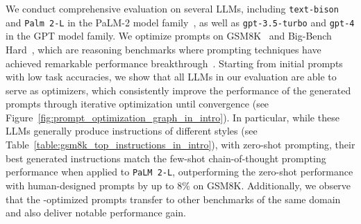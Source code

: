 We conduct comprehensive evaluation on several LLMs, including \texttt{text-bison} and \texttt{Palm 2-L} in the PaLM-2 model family~\citep{anil2023palm}, as well as \texttt{gpt-3.5-turbo} and \texttt{gpt-4} in the GPT model family. 
We optimize prompts on GSM8K~\citep{cobbe2021training} and Big-Bench Hard~\citep{suzgun2022challenging}, which are reasoning benchmarks where prompting techniques have achieved remarkable performance breakthrough~\citep{wei2022chain,kojima2022large,suzgun2022challenging}. Starting from initial prompts with low task accuracies, we show that all LLMs in our evaluation are able to serve as optimizers, which consistently improve the performance of the generated prompts through iterative optimization until convergence (see Figure~\ref{fig:prompt_optimization_graph_in_intro}). 
In particular, while these LLMs generally produce instructions of different styles (see Table~\ref{table:gsm8k_top_instructions_in_intro}), with zero-shot prompting, their best generated instructions match the few-shot chain-of-thought prompting performance when applied to \texttt{PaLM 2-L}, outperforming the zero-shot performance with human-designed prompts by up to $8\%$ on GSM8K.
Additionally, we observe that the \name{}-optimized prompts transfer to other benchmarks of the same domain and also deliver notable performance gain.